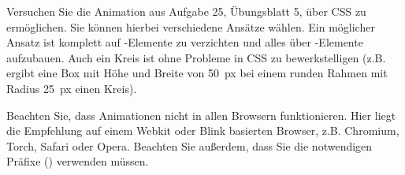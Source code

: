 %
\par Versuchen Sie die Animation aus Aufgabe 25, Übungsblatt 5, über CSS zu ermöglichen. Sie können hierbei verschiedene Ansätze wählen. Ein möglicher Ansatz ist komplett auf -Elemente zu verzichten und alles über -Elemente aufzubauen. Auch ein Kreis ist ohne Probleme in CSS zu bewerkstelligen (z.B. ergibt eine Box mit Höhe und Breite von \qty{50}{px} bei einem runden Rahmen mit Radius \qty{25}{px} einen Kreis).
%
\par Beachten Sie, dass Animationen nicht in allen Browsern funktionieren. Hier liegt die Empfehlung auf einem Webkit oder Blink basierten Browser, z.B. Chromium, Torch, Safari oder Opera. Beachten Sie außerdem, dass Sie die notwendigen Präfixe () verwenden müssen.